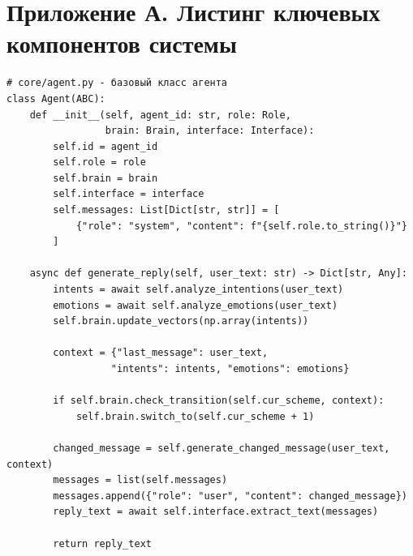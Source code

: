 \documentclass[a4paper,14pt]{extarticle}
\begin{document}
\newpage

\section*{Приложение А. Листинг ключевых компонентов системы}

\begin{verbatim}
# core/agent.py - базовый класс агента
class Agent(ABC):
    def __init__(self, agent_id: str, role: Role, 
                 brain: Brain, interface: Interface):
        self.id = agent_id
        self.role = role
        self.brain = brain
        self.interface = interface
        self.messages: List[Dict[str, str]] = [
            {"role": "system", "content": f"{self.role.to_string()}"}
        ]
    
    async def generate_reply(self, user_text: str) -> Dict[str, Any]:
        intents = await self.analyze_intentions(user_text)
        emotions = await self.analyze_emotions(user_text)
        self.brain.update_vectors(np.array(intents))
        
        context = {"last_message": user_text, 
                  "intents": intents, "emotions": emotions}
        
        if self.brain.check_transition(self.cur_scheme, context):
            self.brain.switch_to(self.cur_scheme + 1)
            
        changed_message = self.generate_changed_message(user_text, context)
        messages = list(self.messages)
        messages.append({"role": "user", "content": changed_message})
        reply_text = await self.interface.extract_text(messages)
        
        return reply_text
\end{verbatim}
\end{document}
